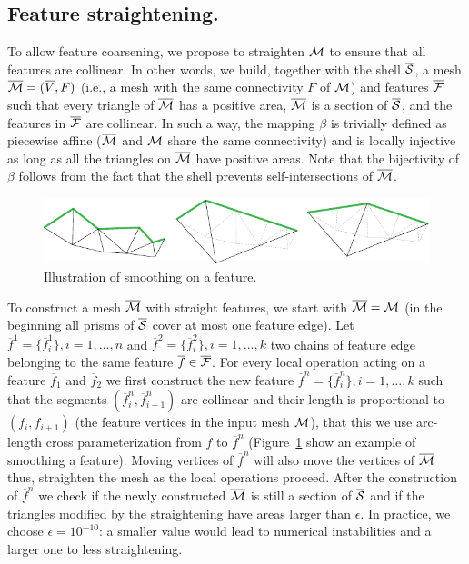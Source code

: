 
\subsection{Feature straightening.}\label{sec:snapping}
To allow feature coarsening, we propose to straighten $\mathcal{M}$ to ensure that all features are collinear. In other words, we build, together with the shell $\overline{\mathcal{S}}$, a mesh $\overline{\mathcal{M}} = (\overline V,F)$ (i.e., a mesh with the same connectivity $F$ of $\mathcal{M}$) and features $\overline {\mathcal{F}}$ such that every triangle of $\overline {\mathcal{M}}$ has a positive area, $\overline {\mathcal{M}}$ is a section of $\overline{\mathcal{S}}$, and the features in $\overline{\mathcal{F}}$ are collinear. 
In such a way, the mapping $\beta$ is trivially defined as piecewise affine ($\overline{\mathcal{M}}$ and $\mathcal{M}$ share the same connectivity) and is locally injective as long as all the triangles on $\overline{\mathcal{M}}$ have positive {areas}. Note that the bijectivity of $\beta$ follows from the fact that the shell prevents self-intersections of $\overline{\mathcal{M}}$.


\begin{figure}
    \centering
    \includegraphics[width=\linewidth]{curve_meshing_in_shell_tex/figs/illustrations/loc-op.pdf}
    \caption{Illustration of smoothing on a feature.}
    \label{bichon:fig:loc-op}
\end{figure}

To construct a mesh $\overline{\mathcal{M}}$ with straight features, 
we start with $\overline{\mathcal{M}} = \mathcal{M}$ (in the beginning all prisms of $\overline{\mathcal{S}}$ cover at most one feature edge).
Let $\overline f^1 = \{\overline f_i^1\}, i=1,\dots,n$ and $\overline f^2 = \{\overline f_i^2\}, i=1,\dots,k$ two chains of {feature} edge belonging to the same feature $\overline f \in \overline{\mathcal{F}}$.
For every local operation acting on a feature $\overline f_1$ and $\overline f_2$  we first construct the new feature $\overline f^n = \{\overline f_i^n\}, i=1,\dots,k$ such that the segments $(\overline f_i^n, \overline f_{i+1}^n)$ are collinear and their length is proportional to $( f_i, f_{i+1})$ (the feature vertices in the input mesh $\mathcal{M}$), that this we use arc-length cross parameterization from $f$ to $\overline f^n$ (Figure~\ref{bichon:fig:loc-op} show an example of smoothing a feature). Moving vertices of $\overline f^n$ will also move the vertices of $\overline{\mathcal{M}}$ thus, straighten the mesh as the local operations {proceed}. After the construction of $\overline f^n$ we check if the newly constructed $\overline{\mathcal{M}}$ is still a section of $\overline{\mathcal{S}}$ and if the triangles modified by the straightening have {areas} larger than  $\epsilon$. In practice, we choose $\epsilon=10^{-10}$: a smaller value would lead to numerical instabilities and a larger one to less straightening.

